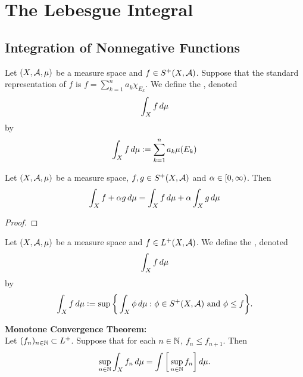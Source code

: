 \documentclass{book}
\begin{document}
	
	
	
	
	
	
	
	
	
	
	
	
	
	
	
	
	\newpage
	\chapter{The Lebesgue Integral}
	
	\section{Integration of Nonnegative Functions}

	\begin{defn} 
		Let $(X, \mathcal{A}, \mu)$ be a measure space and $f \in S^+(X, \mathcal{A})$. Suppose that the standard representation of $f$ is $f = \sum\limits_{k=1}^n a_k \chi_{E_k}$. We define the , denoted 
		$$\int_X f \, d \mu$$
		by 
		$$\int_X f \, d \mu \vcentcolon= \sum\limits_{k=1}^n a_k \mu(E_k)$$ 
	\end{defn}

	\begin{ex} 
		Let $(X, \mathcal{A}, \mu)$ be a measure space, $f,g \in S^+(X, \mathcal{A})$ and $\alpha \in [0,\infty)$. Then  
		$$\int_X f + \alpha g \, d \mu = \int_X f \, d \mu + \alpha \int_X g \, d \mu$$
	\end{ex}

	\begin{proof}
	\end{proof}

	\begin{defn} 
		Let $(X, \mathcal{A}, \mu)$ be a measure space and $f \in L^+(X, \mathcal{A})$. We define the , denoted 
		$$\int_X f \, d \mu$$
		by 
		$$\int_X f \, d \mu \vcentcolon= \sup \bigg \{ \int_X \phi \, d \mu: \phi \in S^+(X, \mathcal{A}) \text{ and } \phi \leq f \bigg\}.$$
	\end{defn}

	\begin{ex}
	\end{ex}

	\begin{thm}  \textbf{Monotone Convergence Theorem:} \\
		Let $(f_n)_{n \in \mathbb{N}} \subset L^+$. Suppose that for each $n \in \mathbb{N}$, $f_n \leq f_{n+1}$. Then 
		$$\sup\limits_{n \in \mathbb{N}} \int_X f_n \, d \mu = \int \bigg[ \sup\limits_{n \in \mathbb{N}} f_n \bigg] \, d \mu. $$
	\end{thm}
\end{document}
